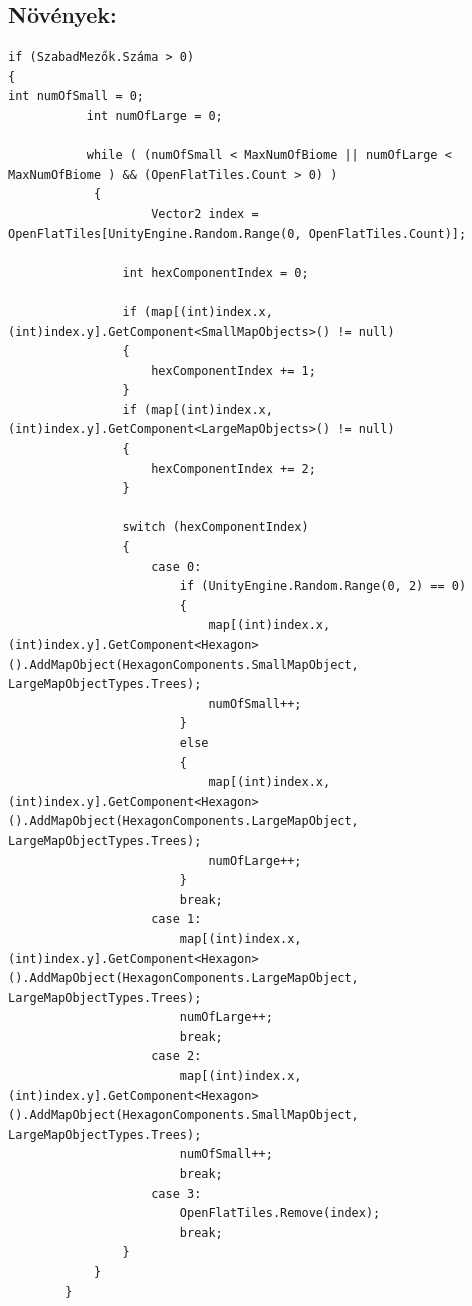 \subsection{Növények:}

\begin{verbatim}
if (SzabadMezők.Száma > 0)
{
int numOfSmall = 0;
           int numOfLarge = 0;

           while ( (numOfSmall < MaxNumOfBiome || numOfLarge < MaxNumOfBiome ) && (OpenFlatTiles.Count > 0) )
            {
                	Vector2 index = OpenFlatTiles[UnityEngine.Random.Range(0, OpenFlatTiles.Count)];
                
                int hexComponentIndex = 0;

                if (map[(int)index.x, (int)index.y].GetComponent<SmallMapObjects>() != null)
                {
                    hexComponentIndex += 1;
                }
                if (map[(int)index.x, (int)index.y].GetComponent<LargeMapObjects>() != null)
                {
                    hexComponentIndex += 2;
                }

                switch (hexComponentIndex)
                {
                    case 0:
                        if (UnityEngine.Random.Range(0, 2) == 0)
                        {
                            map[(int)index.x, (int)index.y].GetComponent<Hexagon>().AddMapObject(HexagonComponents.SmallMapObject, LargeMapObjectTypes.Trees);
                            numOfSmall++;
                        }
                        else
                        {
                            map[(int)index.x, (int)index.y].GetComponent<Hexagon>().AddMapObject(HexagonComponents.LargeMapObject, LargeMapObjectTypes.Trees);
                            numOfLarge++;
                        }
                        break;
                    case 1:
                        map[(int)index.x, (int)index.y].GetComponent<Hexagon>().AddMapObject(HexagonComponents.LargeMapObject, LargeMapObjectTypes.Trees);
                        numOfLarge++;
                        break;
                    case 2:
                        map[(int)index.x, (int)index.y].GetComponent<Hexagon>().AddMapObject(HexagonComponents.SmallMapObject, LargeMapObjectTypes.Trees);
                        numOfSmall++;
                        break;
                    case 3:
                        OpenFlatTiles.Remove(index);
                        break;
                }
            }
        }
\end{verbatim}
